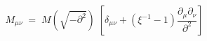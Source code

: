 \begin{equation}
M_{\mu\nu} \;=\; M(\sqrt{-\partial^2}) \; \left[ \delta_{\mu\nu} +
  (\xi^{-1}-1) 
\frac{\partial_\mu\partial_\nu}{\partial^2} \right]
\end{equation}

